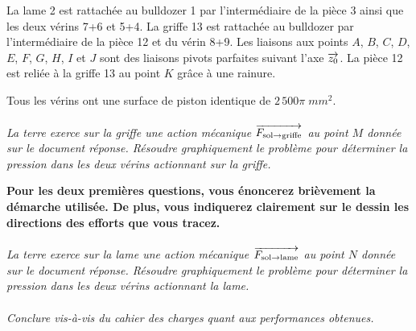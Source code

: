 \documentclass[11pt,oneside]{article}
\begin{document}
La lame 2 est rattachée au bulldozer 1 par l'intermédiaire de la pièce 3 ainsi que les deux vérins 7+6 et 5+4. La griffe 13 est rattachée au bulldozer par l'intermédiaire de la pièce 12 et du vérin 8+9. Les liaisons aux points $A$, $B$, $C$, $D$, $E$, $F$, $G$, $H$, $I$ et $J$ sont des liaisons pivots parfaites suivant l'axe $\overrightarrow{z_0}$. La pièce 12 est reliée à la griffe 13 au point $K$ grâce à une rainure. 

Tous les vérins ont une surface de piston identique de $2\, 500\pi\; mm^2$.

\paragraph{}
\textit{La terre exerce sur la griffe une action mécanique $\overrightarrow{F_{\text{sol}\rightarrow \text{griffe}}}$ au point $M$ donnée sur le document réponse. Résoudre graphiquement le problème pour déterminer la pression dans les deux vérins actionnant sur la griffe.}

\textbf{Pour les deux premières questions, vous énoncerez brièvement la démarche utilisée. De plus, vous indiquerez clairement sur le dessin les directions des efforts que vous tracez.}

\paragraph{}
\textit{La terre exerce sur la lame une action mécanique $\overrightarrow{F_{\text{sol}\rightarrow \text{lame}}}$ au point $N$ donnée sur le document réponse. Résoudre graphiquement le problème pour déterminer la pression dans les deux vérins actionnant la lame.}


\paragraph{}
\textit{Conclure vis-à-vis du cahier des charges quant aux performances obtenues.}


\newpage 

\begin{center}
\end{center}
\end{document}
